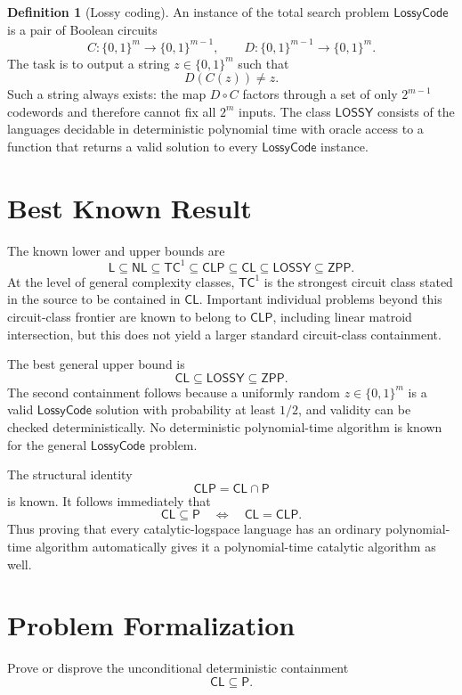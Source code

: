 \documentclass[10pt,a4paper]{article}
\theoremstyle{definition}
\newtheorem*{definition*}{Definition}
\newcommand{\CL}{\mathsf{CL}}
\newcommand{\CLP}{\mathsf{CLP}}
\newcommand{\Lclass}{\mathsf{L}}
\newcommand{\NL}{\mathsf{NL}}
\newcommand{\TC}{\mathsf{TC}}
\newcommand{\Pclass}{\mathsf{P}}
\newcommand{\ZPP}{\mathsf{ZPP}}
\newcommand{\LOSSY}{\mathsf{LOSSY}}
\begin{document}
\begin{definition*}[Lossy coding]
An instance of the total search problem $\mathsf{LossyCode}$ is a pair of
Boolean circuits
\begin{equation}
  C:\{0,1\}^m\longrightarrow\{0,1\}^{m-1},
  \qquad
  D:\{0,1\}^{m-1}\longrightarrow\{0,1\}^m.
\end{equation}
The task is to output a string $z\in\{0,1\}^m$ such that
\begin{equation}
  D(C(z))\neq z.
\end{equation}
Such a string always exists: the map $D\circ C$ factors through a set of only
$2^{m-1}$ codewords and therefore cannot fix all $2^m$ inputs. The class
$\LOSSY$ consists of the languages decidable in deterministic polynomial time
with oracle access to a function that returns a valid solution to every
$\mathsf{LossyCode}$ instance.
\end{definition*}

\newpage
\section{Best Known Result}

The known lower and upper bounds are
\begin{equation}
  \Lclass
  \subseteq
  \NL
  \subseteq
  \TC^1
  \subseteq
  \CLP
  \subseteq
  \CL
  \subseteq
  \LOSSY
  \subseteq
  \ZPP.
\end{equation}
At the level of general complexity classes, $\TC^1$ is the strongest circuit
class stated in the source to be contained in $\CL$. Important individual
problems beyond this circuit-class frontier are known to belong to $\CLP$,
including linear matroid intersection, but this does not yield a larger
standard circuit-class containment.

The best general upper bound is
\begin{equation}
  \CL\subseteq\LOSSY\subseteq\ZPP.
\end{equation}
The second containment follows because a uniformly random
$z\in\{0,1\}^m$ is a valid $\mathsf{LossyCode}$ solution with probability at
least $1/2$, and validity can be checked deterministically. No deterministic
polynomial-time algorithm is known for the general $\mathsf{LossyCode}$
problem.

The structural identity
\begin{equation}
  \CLP=\CL\cap\Pclass
\end{equation}
is known. It follows immediately that
\begin{equation}
  \CL\subseteq\Pclass
  \quad\Longleftrightarrow\quad
  \CL=\CLP.
\end{equation}
Thus proving that every catalytic-logspace language has an ordinary
polynomial-time algorithm automatically gives it a polynomial-time catalytic
algorithm as well.

\section{Problem Formalization}


Prove or disprove the unconditional deterministic containment
\begin{equation}
  \CL\subseteq\Pclass.
\end{equation}
\end{document}
